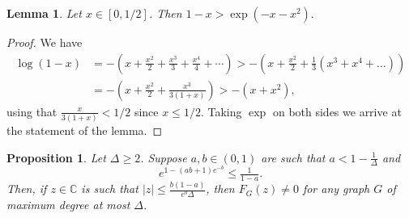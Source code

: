 \documentclass[a4paper,11pt,reqno]{amsart}
\newtheorem{lemma}[corollary]{Lemma}
\newtheorem{proposition}[corollary]{Proposition}
\numberwithin{equation}{section}
\begin{document}
\begin{lemma}\label{lem:bound log(1+x)}
Let $x\in [0,1/2]$. Then $1-x> \exp(-x-x^2).$
\end{lemma}
\begin{proof}
We have
\begin{align*}
\log(1-x)&=-\left(x+\frac{x^2}{2}+\frac{x^3}{3}+\frac{x^4}{4}+\cdots\right)>-\left(x+\frac{x^2}{2}+\frac{1}{3}(x^3+x^4+\ldots)\right )
\\
&=-\left(x+\frac{x^2}{2}+\frac{x^3}{3(1+x)}\right )>-(x+x^2),
\end{align*}
using that $\tfrac{x}{3(1+x)}< 1/2$ since $x\leq 1/2.$
Taking $\exp$ on both sides we arrive at the statement of the lemma.
\end{proof}

\begin{proposition}\label{prop:main general}
Let $\Delta\geq 2$. 
Suppose $a,b\in (0,1)$ are such that $a<1-\tfrac{1}{\Delta}$ and
\[
e^{1-(ab+1)e^{-b}}\leq \tfrac{1}{1-a}.
\]
Then, if $z\in \mathbb{C}$ is such that $|z|\leq \frac{b(1-a)}{e^b\Delta}$, then $F_G(z) \neq 0$ for any graph $G$ of maximum degree at most $\Delta$.    
\end{proposition}
\end{document}
